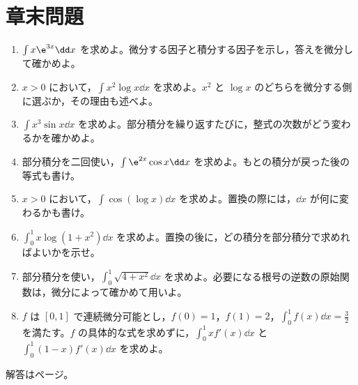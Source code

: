 \section*{章末問題}
\begin{enumerate}[label=\textbf{\thechapter.\arabic*},leftmargin=*]
 \item\label{問:部分一次指数} $\int x\e^{3x}\dd x$ を求めよ。微分する因子と積分する因子を示し，答えを微分して確かめよ。
 \item\label{問:部分整式対数} $x>0$ において，$\int x^2\log x\dd x$ を求めよ。$x^2$ と $\log x$ のどちらを微分する側に選ぶか，その理由も述べよ。
 \item\label{問:部分反復} $\int x^3\sin x\dd x$ を求めよ。部分積分を繰り返すたびに，整式の次数がどう変わるかを確かめよ。
 \item\label{問:部分循環} 部分積分を二回使い，$\int\e^{2x}\cos x\dd x$ を求めよ。もとの積分が戻った後の等式も書け。
 \item\label{問:部分対数余弦} $x>0$ において，$\int\cos(\log x)\dd x$ を求めよ。置換の際には，$\dd x$ が何に変わるかも書け。
 \item\label{問:部分置換定積分} $\int_0^1x\log(1+x^2)\dd x$ を求めよ。置換の後に，どの積分を部分積分で求めればよいかを示せ。
 \item\label{問:部分根号定積分} 部分積分を使い，$\int_0^1\sqrt{4+x^2}\dd x$ を求めよ。必要になる根号の逆数の原始関数は，微分によって確かめて用いよ。
 \item\label{問:部分情報だけの計算} $f$ は $[0,1]$ で連続微分可能とし，$f(0)=1$，$f(1)=2$，$\int_0^1f(x)\dd x=\frac32$ を満たす。$f$ の具体的な式を求めずに，$\int_0^1xf'(x)\dd x$ と $\int_0^1(1-x)f'(x)\dd x$ を求めよ。
\end{enumerate}

\smallskip\noindent 解答は\pageref{解答:第6章}ページ。

